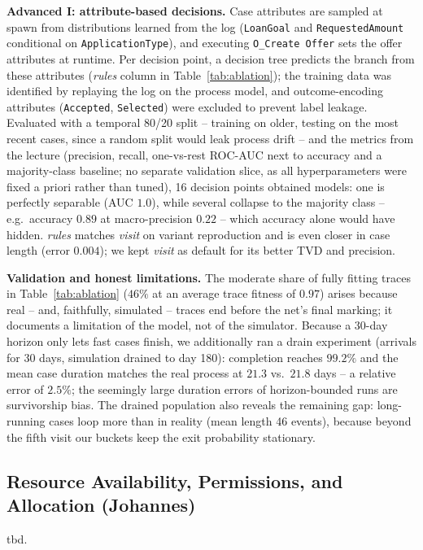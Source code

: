 \documentclass[
  english,        %
  font=times,     %
  twocolumn,      %
]{tumarticle}
\begin{document}
\textbf{Advanced I: attribute-based decisions.} Case attributes are sampled
at spawn from distributions learned from the log
(\texttt{LoanGoal} and \texttt{RequestedAmount} conditional on
\texttt{ApplicationType}), and executing \texttt{O\_Create Offer} sets the
offer attributes at runtime. Per decision point, a decision tree predicts
the branch from these attributes (\emph{rules} column in
Table~\ref{tab:ablation}); the training data was identified by replaying the
log on the process model, and outcome-encoding attributes
(\texttt{Accepted}, \texttt{Selected}) were excluded to prevent label
leakage. Evaluated with a temporal 80/20 split -- training on older, testing on the
most recent cases, since a random split would leak process drift -- and the
metrics from the lecture (precision, recall, one-vs-rest ROC-AUC next to
accuracy and a majority-class baseline; no separate validation slice, as all
hyperparameters were fixed a priori rather than tuned), 16 decision points
obtained models: one is
perfectly separable (AUC $1.0$), while several collapse to the majority
class -- e.g.\ accuracy $0.89$ at macro-precision $0.22$ -- which accuracy
alone would have hidden. \emph{rules} matches \emph{visit} on variant
reproduction and is even closer in case length (error $0.004$); we kept
\emph{visit} as default for its better TVD and precision.

\textbf{Validation and honest limitations.} The moderate share of fully
fitting traces in Table~\ref{tab:ablation} ($46\%$ at an average trace
fitness of $0.97$) arises because real -- and, faithfully, simulated --
traces end before the net's final marking; it documents a limitation of the
model, not of the simulator. Because a 30-day horizon only lets fast cases
finish, we additionally ran a drain experiment (arrivals for 30 days,
simulation drained to day 180): completion reaches $99.2\%$ and the mean
case duration matches the real process at $21.3$ vs.\ $21.8$ days --
a relative error of $2.5\%$; the seemingly large duration errors of
horizon-bounded runs are survivorship bias. The drained population also
reveals the remaining gap: long-running cases loop more than in reality
(mean length 46 events), because beyond the fifth visit our buckets keep
the exit probability stationary.

\subsection{Resource Availability, Permissions, and Allocation (Johannes)}
tbd.
\end{document}
